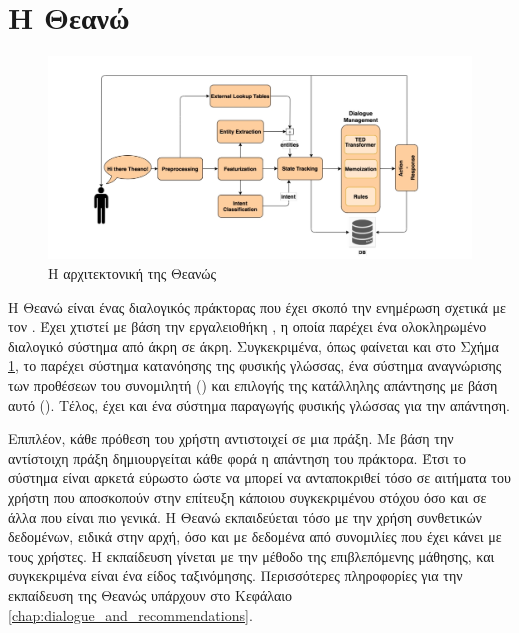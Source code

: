 \section{Η Θεανώ}

\begin{figure}
    \centering
    \includegraphics[width=\textwidth]{body_matter/introduction/images/theano-architecture.jpeg}
    \caption{Η αρχιτεκτονική της Θεανώς}
    \label{fig:theano_architecture}
\end{figure}

Η Θεανώ είναι ένας διαλογικός πράκτορας που έχει σκοπό την ενημέρωση σχετικά με τον \cite{ventoura-etal-2021-theano}.
Έχει χτιστεί με βάση την εργαλειοθήκη , η οποία παρέχει ένα ολοκληρωμένο διαλογικό σύστημα από άκρη σε άκρη.
Συγκεκριμένα, όπως φαίνεται και στο Σχήμα \ref{fig:theano_architecture}, το  παρέχει σύστημα κατανόησης της φυσικής γλώσσας,
ένα σύστημα αναγνώρισης των προθέσεων του συνομιλητή () και επιλογής της κατάλληλης απάντησης με βάση αυτό ().
Τέλος, έχει και ένα σύστημα παραγωγής φυσικής γλώσσας για την απάντηση.

Επιπλέον, κάθε πρόθεση του χρήστη αντιστοιχεί σε μια πράξη. Με βάση την αντίστοιχη πράξη δημιουργείται κάθε φορά η απάντηση του πράκτορα.
Έτσι το σύστημα είναι αρκετά εύρωστο ώστε να μπορεί να ανταποκριθεί τόσο σε αιτήματα του χρήστη που αποσκοπούν στην επίτευξη κάποιου
συγκεκριμένου στόχου όσο και σε άλλα που είναι πιο γενικά. H Θεανώ εκπαιδεύεται τόσο με την χρήση συνθετικών δεδομένων, ειδικά στην αρχή,
όσο και με δεδομένα από συνομιλίες που έχει κάνει με τους χρήστες.
Η εκπαίδευση γίνεται με την μέθοδο της επιβλεπόμενης μάθησης, και συγκεκριμένα είναι ένα είδος ταξινόμησης. Περισσότερες πληροφορίες για την
εκπαίδευση της Θεανώς υπάρχουν στο Κεφάλαιο \ref{chap:dialogue_and_recommendations}.

